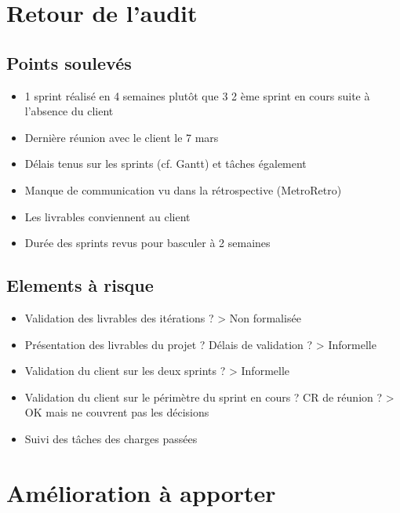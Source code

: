 \documentclass{article}
\begin{document}
\vspace{0.5cm}

\section{Retour de l'audit}
\subsection{Points soulevés}
\begin{itemize}
    \item 1 sprint réalisé en 4 semaines plutôt que 3 2 ème sprint en cours suite à l’absence du client
    \item Dernière réunion avec le client le 7 mars
    \item Délais tenus sur les sprints (cf. Gantt) et tâches également
    \item Manque de communication vu dans la rétrospective (MetroRetro)
    \item Les livrables conviennent au client
    \item Durée des sprints revus pour basculer à 2 semaines
\end{itemize}

\subsection{Elements à risque}
\begin{itemize}
    \item Validation des livrables des itérations ? > Non formalisée
    \item Présentation des livrables du projet ? Délais de validation ? > Informelle
    \item Validation du client sur les deux sprints ? > Informelle
    \item Validation du client sur le périmètre du sprint en cours ? CR de réunion ? > OK mais ne couvrent pas les décisions
    \item Suivi des tâches des charges passées
\end{itemize}
\newpage
\section{Amélioration à apporter}
\end{document}
